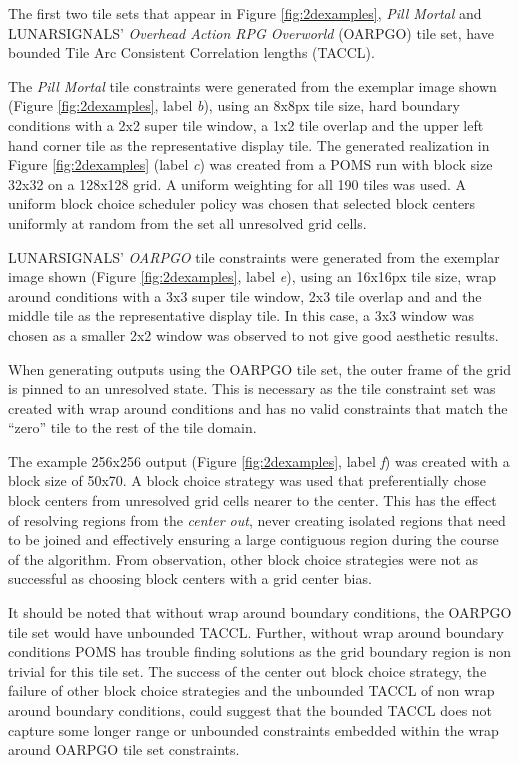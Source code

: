 The first two tile sets that appear in Figure \ref{fig:2dexamples}, \textit{Pill Mortal} and LUNARSIGNALS' \textit{Overhead Action RPG Overworld}
(OARPGO) tile set,
have bounded Tile Arc Consistent Correlation lengths (TACCL).

The \textit{Pill Mortal} tile constraints were generated from the exemplar image shown (Figure \ref{fig:2dexamples}, label \textit{b}), using
an 8x8px tile size, hard boundary conditions with a 2x2 super tile window, a 1x2 tile overlap and the upper left hand corner tile as the representative
display tile.
The generated realization in Figure \ref{fig:2dexamples} (label \textit{c}) was created from a POMS run with block size 32x32 on a 128x128 grid.
A uniform weighting for all 190 tiles was used.
A uniform block choice scheduler policy was chosen that selected block centers uniformly at random from the set all unresolved grid cells.

LUNARSIGNALS' \textit{OARPGO} tile constraints were generated from the exemplar image shown (Figure \ref{fig:2dexamples}, label \textit{e}), using
an 16x16px tile size, wrap around conditions with a 3x3 super tile window, 2x3 tile overlap and and the middle tile as the representative
display tile.
In this case, a 3x3 window was chosen as a smaller 2x2 window was observed to not give good aesthetic results.

When generating outputs using the OARPGO tile set, the outer frame of the grid is pinned to an unresolved state.
This is necessary as the tile constraint set was created with wrap around conditions and has no valid constraints that match the ``zero'' tile
to the rest of the tile domain.

The example 256x256 output (Figure \ref{fig:2dexamples}, label \textit{f})
was created with a block size of 50x70.
A block choice strategy was used that preferentially chose block centers from unresolved grid cells
nearer to the center.
This has the effect of resolving regions from the \textit{center out}, never creating isolated regions that need to be joined and effectively
  ensuring a large contiguous region during the course of the algorithm.
From observation, other block choice strategies were not as successful as choosing block centers with a grid center bias.

It should be noted that without wrap around boundary conditions, the OARPGO tile set would have unbounded TACCL.
Further, without wrap around boundary conditions POMS has trouble finding solutions as the
grid boundary region is non trivial for this tile set.
The success of the center out block choice strategy, the failure of other block choice strategies and the unbounded TACCL of
non wrap around boundary conditions, could suggest that the bounded TACCL does not capture some longer range or unbounded constraints
  embedded within the wrap around OARPGO tile set constraints.

